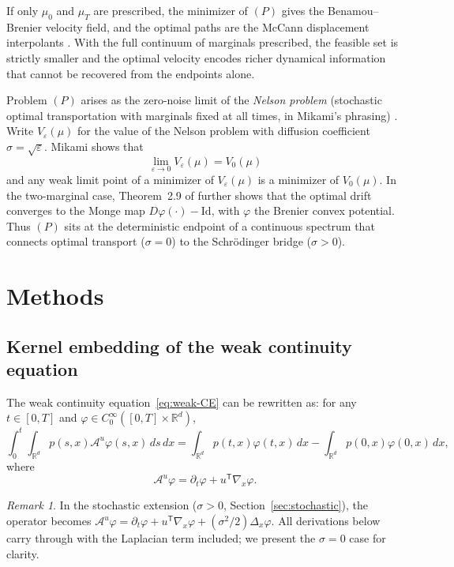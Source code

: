 \documentclass[11pt,leqno]{article}
\theoremstyle{plain}
\theoremstyle{remark}
\newtheorem*{rem}{Remark}
\theoremstyle{definition}
\numberwithin{equation}{section}
\numberwithin{figure}{section}
\numberwithin{table}{section}
\begin{document}
If only $\mu_0$ and $\mu_T$ are prescribed, the minimizer of $(P)$ gives the
Benamou--Brenier velocity field, and the optimal paths are the McCann
displacement interpolants \cite{McCann1997}.
With the full continuum of marginals prescribed, the feasible set is
strictly smaller and the optimal velocity encodes richer dynamical information that cannot be
recovered from the endpoints alone.

Problem $(P)$ arises as the zero-noise limit of the \emph{Nelson problem}
(stochastic optimal transportation with marginals fixed at all times,
in Mikami's \cite{Mikami2021} phrasing)
\cite{Nelson1985,Mikami1990,Mikami2021}.
Write $V_\varepsilon(\mu)$ for the value of the Nelson problem
with diffusion coefficient $\sigma=\sqrt{\varepsilon}$.
Mikami \cite[Theorem~3.7]{Mikami2021} shows that
\begin{equation}\label{eq:Veps-to-V0}
  \lim_{\varepsilon\to 0}V_\varepsilon(\mu) = V_0(\mu)
\end{equation}
and any weak limit point of a minimizer of
$V_\varepsilon(\mu)$ is a minimizer of
$V_0(\mu)$.
In the two-marginal case, Theorem~2.9 of \cite{Mikami2021} further shows that
the optimal drift converges to the Monge map
$D\varphi(\cdot)-\mathrm{Id}$,
with $\varphi$ the Brenier convex potential.
Thus $(P)$ sits at the deterministic endpoint of a continuous spectrum that
connects optimal transport ($\sigma=0$) to the Schr\"odinger bridge
($\sigma>0$).


\section{Methods}
\label{sec:3}


\subsection{Kernel embedding of the weak continuity equation}
\label{sec:3-embedding}

The weak continuity equation~\eqref{eq:weak-CE} can be rewritten as:
for any $t\in [0,T]$ and $\varphi\in C^{\infty}_0([0,T]\times\mathbb{R}^d)$, 
\begin{equation}
\label{eq:3.1}
 \int_0^t\int_{\mathbb{R}^d}p(s,x)\mathcal{A}^u\varphi(s,x)\, ds\,dx = \int_{\mathbb{R}^d}p(t,x)\varphi(t,x)\,dx - \int_{\mathbb{R}^d}p(0,x)\varphi(0,x)\,dx,
\end{equation}
where
\[
 \mathcal{A}^u\varphi = \partial_t\varphi + u^{\mathsf{T}}\nabla_x\varphi.
\]
\begin{rem}
In the stochastic extension ($\sigma>0$, Section~\ref{sec:stochastic}),
the operator becomes
$\mathcal{A}^u\varphi = \partial_t\varphi + u^{\mathsf{T}}\nabla_x\varphi
+ (\sigma^2/2)\Delta_x\varphi$.
All derivations below carry through with the Laplacian term included;
we present the $\sigma=0$ case for clarity.
\end{rem}
\end{document}
